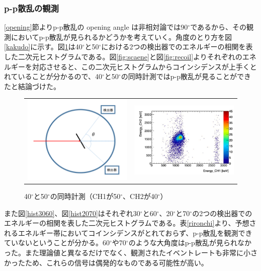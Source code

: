 \documentclass[a4paper,11pt,dvipdfmx]{jsarticle}
\begin{document}
\subsubsection{p-p散乱の観測}
\ref{opening}節よりp-p散乱の opening angle は非相対論では90$^{\circ}$であるから、その観測においてp-p散乱が見られるかどうかを考えていく。角度のとり方を図\ref{kakudo}に示す。図\ref{4050}は40$^{\circ}$と50$^{\circ}$における2つの検出器でのエネルギーの相関を表した二次元ヒストグラムである。図\ref{fig:scaene}と図\ref{fig:recoil}よりそれぞれのエネルギーを対応させると、この二次元ヒストグラムからコインシデンスが上手くとれていることが分かるので、40$^{\circ}$と50$^{\circ}$の同時計測ではp-p散乱が見ることができたと結論づけた。
\begin{figure}[H]
    \begin{tabular}{cc}
      \begin{minipage}[t]{0.45\hsize}
        \centering
        \includegraphics[width=70mm]{picture/jan/kakudo.png}
        \caption{角度のとり方}
        \label{kakudo}
      \end{minipage} &
      \begin{minipage}[t]{0.45\hsize}
        \centering
        \includegraphics[width=70mm]{picture/jan/4050.png}
        \caption{40$^{\circ}$と50$^{\circ}$の同時計測（CH1が50$^\circ$、CH2が40$^\circ$）}
        \label{4050}
      \end{minipage}
    \end{tabular}
\end{figure}
また図\ref{hist3060}、図\ref{hist2070}はそれぞれ30$^{\circ}$と60$^{\circ}$、20$^{\circ}$と70$^{\circ}$の2つの検出器でのエネルギーの相関を表した二次元ヒストグラムである。表\ref{rironchi}より、予想されるエネルギー帯においてコインシデンスがとれておらず、p-p散乱を観測できていないということが分かる。60$^{\circ}$や70$^{\circ}$のような大角度はp-p散乱が見られなかった。また理論値と異なるだけでなく、観測されたイベントレートも非常に小さかったため、これらの信号は偶発的なものである可能性が高い。
\end{document}
